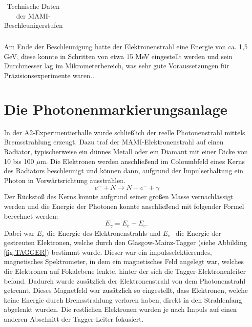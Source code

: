 \documentclass[a4paper,11pt,oneside,final,german,openbib,pdftex]{scrbook}
\begin{document}
{\begin{table}[h!]
\begin{tabular}{|l|c|c|c|c|}
	
		\end{tabular}

		\caption{Technische Daten der MAMI-Beschleunigerstufen \cite{Un08}}
		\label{tab.MAMIstufen}

\end{table}

 Am Ende der Beschleunigung hatte der Elektronenstrahl eine Energie von ca. 1,5 GeV, diese konnte in Schritten von etwa 15 MeV eingestellt werden und sein Durchmesser lag im Mikrometerbereich, was sehr gute Voraussetzungen f\"ur Pr\"azisionsexperimente waren.\cite{KPh07}. 
 
 
 \section{Die Photonenmarkierungsanlage}
 
 In der A2-Experimentierhalle wurde schlie{\ss}lich der reelle Photonenstrahl mittels Bremsstrahlung erzeugt. Dazu traf der MAMI-Elektronenstrahl auf einen Radiator, typischerweise ein d\"unnes Metall oder ein Diamant mit einer Dicke von 10 bis 100 $\mu$m. Die Elektronen werden anschlie{\ss}end im Coloumbfeld eines Kerns des Radiators beschleunigt und k\"onnen dann, aufgrund der Impulserhaltung ein Photon in Vorw\"artsrichtung ausstrahlen.
 \begin{equation}
 e^{-}+N\rightarrow N + e^{-}+\gamma
 \label{eq.Streuung}
 \end{equation}
  Der R\"ucksto{\ss} des Kerns konnte aufgrund seiner gro{\ss}en Masse vernachl\"assigt werden und die Energie der Photonen konnte anschlie{\ss}end mit folgender Formel berechnet werden:
  \begin{equation}
  E_{\gamma}= E_{e^{}}-E_{e^-}
  \label{eq.Photonenenergie}
  \end{equation}
 Dabei war $E_e$ die Energie des Elektronenstrahls und $E_{e^-}$ die Energie der gestreuten Elektronen, welche durch den Glasgow-Mainz-Tagger (siehe Abbilding \ref{fig.TAGGER}) bestimmt wurde.
 Dieser war ein impulsselektierendes, magnetisches Spektrometer, in dem ein magnetisches Feld angelegt war, welches die Elektronen auf Fokalebene lenkte, hinter der sich die Tagger-Elektronenleiter befand. Dadurch wurde zus\"atzlich der Elektronenstrahl von dem Photonenstrahl getrennt. Dieses Magnetfeld war zus\"atzlich so eingestellt, dass Elektronen, welche keine Energie durch Bremsstrahlung verloren haben, direkt in den Strahlenfang abgelenkt wurden. Die restlichen Elektronen wurden je nach Impuls auf einen anderen Abschnitt der Tagger-Leiter fokusiert.
 
}
\end{document}
